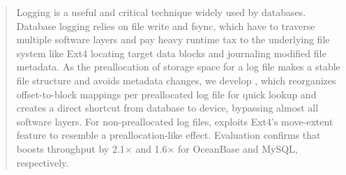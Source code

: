 \begin{abstract}
Logging is a useful and critical technique   widely used by databases.
Database logging relies on file write and fsync, which have to
traverse multiple software layers and pay
  heavy runtime tax
  to
  the underlying file system like Ext4
  locating target data blocks and journaling modified file metadata.
As the
  preallocation of storage space for a log file makes a stable file structure and avoids
metadata changes, we develop \odes, which reorganizes offset-to-block mappings per preallocated log file for quick lookup  and creates a direct shortcut    from database to device, bypassing almost all software layers. 
  For non-preallocated log files, \odes exploits Ext4’s move-extent feature to resemble a preallocation-like effect. Evaluation confirms
  that \odes boosts throughput by 2.1$\times$ and 1.6$\times$ for OceanBase and MySQL, respectively.
\end{abstract}


